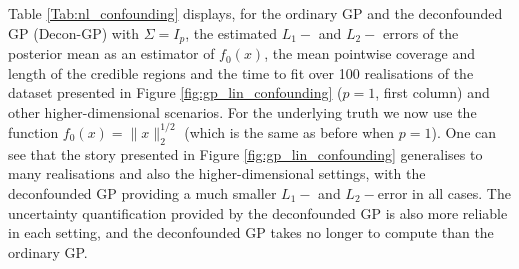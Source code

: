 \documentclass[11pt]{article}
\numberwithin{equation}{section}
\begin{document}
Table \ref{Tab:nl_confounding} displays, for the ordinary GP and the deconfounded GP (Decon-GP) with $\Sigma = I_p$, the estimated $L_1-$ and $L_2-$ errors of the posterior mean as an estimator of $f_0(x)$, the mean pointwise coverage and length of the credible regions and the time to fit over 100 realisations of the dataset presented in Figure \ref{fig:gp_lin_confounding} ($p = 1$, first column) and other higher-dimensional scenarios. For the underlying truth we now use the function $f_0(x) = \|x\|_2^{1/2}$ (which is the same as before when $p = 1$). One can see that the story presented in Figure \ref{fig:gp_lin_confounding} generalises to many realisations and also the higher-dimensional settings, with the deconfounded GP providing a much smaller $L_1-$ and $L_2-$error in all cases. The uncertainty quantification provided by the deconfounded GP is also more reliable in each setting, and the deconfounded GP takes no longer to compute than the ordinary GP.
\end{document}
